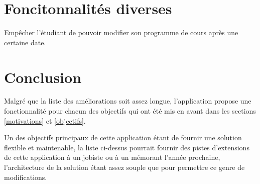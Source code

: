 \section{Foncitonnalités diverses}
Empêcher l'étudiant de pouvoir modifier son programme de cours après une certaine date. 
\section{Conclusion}
Malgré que la liste des améliorations soit assez longue, l'application propose une fonctionnalité pour chacun des objectifs qui ont été mis en avant dans les sections \ref{motivations} et \ref{objectifs}.

Un des objectifs principaux de cette application étant de fournir une solution flexible et maintenable, la liste ci-dessus pourrait fournir des pistes d'extensions de cette application à un jobiste ou à un mémorant l'année prochaine, l'architecture de la solution étant assez souple que pour permettre ce genre de modifications.  



